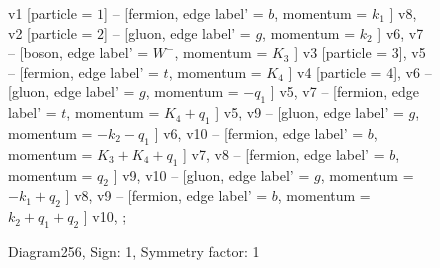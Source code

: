 \documentclass{revtex4}
\begin{document}
\begin{figure}[!htb]
\begin{center}
{    %
v1 [particle = \(1\)] -- [fermion, edge label' = \(b\), momentum = \(k_{1}\) ] v8, 
v2 [particle = \(2\)] -- [gluon, edge label' = \(g\), momentum = \(k_{2}\) ] v6, 
v7 -- [boson, edge label' = \(W^{-}\), momentum = \(K_{3}\) ] v3 [particle = \(3\)], 
v5 -- [fermion, edge label' = \(t\), momentum = \(K_{4}\) ] v4 [particle = \(4\)], 
v6 -- [gluon, edge label' = \(g\), momentum = \(-q_{1}\) ] v5, 
v7 -- [fermion, edge label' = \(t\), momentum = \(K_{4} + q_{1}\) ] v5, 
v9 -- [gluon, edge label' = \(g\), momentum = \(-k_{2} - q_{1}\) ] v6, 
v10 -- [fermion, edge label' = \(b\), momentum = \(K_{3} + K_{4} + q_{1}\) ] v7, 
v8 -- [fermion, edge label' = \(b\), momentum = \(q_{2}\) ] v9, 
v10 -- [gluon, edge label' = \(g\), momentum = \(-k_{1} + q_{2}\) ] v8, 
v9 -- [fermion, edge label' = \(b\), momentum = \(k_{2} + q_{1} + q_{2}\) ] v10, 
};
\end{center}
\caption{Diagram256, Sign: 1, Symmetry factor: 1}
\end{figure}
\newpage
\end{document}
